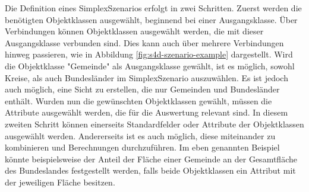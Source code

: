 Die Definition eines SimplexSzenarios erfolgt in zwei Schritten. Zuerst werden die benötigten Objektklassen ausgewählt, beginnend bei einer Ausgangsklasse. Über Verbindungen können Objektklassen ausgewählt werden, die mit dieser Ausgangsklasse verbunden sind. Dies kann auch über mehrere Verbindungen hinweg passieren, wie in Abbildung \ref{fig:s4d-szenario-example} dargestellt. Wird die Objektklasse "Gemeinde" als Ausgangsklasse gewählt, ist es möglich, sowohl Kreise, als auch Bundesländer im SimplexSzenario auszuwählen. Es ist jedoch auch möglich, eine Sicht zu erstellen, die nur Gemeinden und Bundesländer enthält. Wurden nun die gewünschten Objektklassen gewählt, müssen die Attribute ausgewählt werden, die für die Auswertung relevant sind. In diesem zweiten Schritt können einerseits Standardfelder oder Attribute der Objektklassen ausgewählt werden. Andererseits ist es auch möglich, diese miteinander zu kombinieren und Berechnungen durchzuführen. Im eben genannten Beispiel könnte beispielsweise der Anteil der Fläche einer Gemeinde an der Gesamtfläche des Bundeslandes festgestellt werden, falls beide Objektklassen ein Attribut mit der jeweiligen Fläche besitzen.
